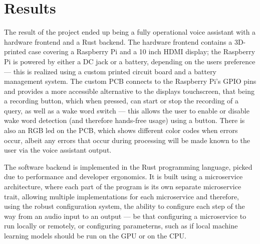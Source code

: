 \cleardoubleemptypage
\renewcommand*\chapterpagestyle{scrheadings}
\chapter{Results}
The result of the project ended up being a fully operational voice assistant with a hardware frontend and a Rust backend.
The hardware frontend contains a 3D-printed case covering a Raspberry Pi and a 10 inch HDMI display;
the Raspberry Pi is powered by either a DC jack or a battery, depending on the users preference ---
this is realized using a custom printed circuit board and a battery management system.
The custom PCB connects to the Raspberry Pi's GPIO pins and provides a more accessible alternative to the displays touchscreen,
that being a recording button, which when pressed, can start or stop the recording of a query,
as well as a wake word switch --- this allows the user to enable or disable wake word detection (and therefore hands-free usage) using a button.
There is also an RGB led on the PCB, which shows different color codes when errors occur, albeit any errors
that occur during processing will be made known to the user via the voice assistant output.

The software backend is implemented in the Rust programming language, picked due to performance and developer ergonomics.
It is built using a microservice architecture, where each part of the program is its own separate microservice trait,
allowing multiple implementations for each microservice and therefore, using the robust configuration system,
the ability to configure each step of the way from an audio input to an output --- be that configuring
a microservice to run locally or remotely, or configuring parameterns, such as if local machine learning models
should be run on the GPU or on the CPU.

